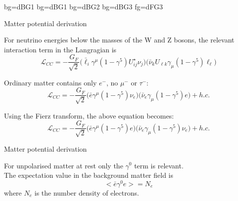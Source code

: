 {

          {bg=dBG1}
 {bg=dBG1}
  {bg=dBG2}
   {bg=dBG3}
   {fg=dFG3}

\begin{frame}{Matter potential derivation}

For neutrino energies below the masses of the W and Z bosons,
the relevant interaction term in the Langragian is
\begin{equation*}
\mathcal{L}_{CC} = -\frac{G_{F}}{\sqrt{2}}
  \Big( \bar{\ell}_{i} {\gamma}^{\mu} (1-{\gamma}^{5}) U^{\star}_{ij} {\nu}_{j} \Big)
  \Big( \bar{\nu}_{k} U_{\ell k} {\gamma}_{\mu} (1-{\gamma}^{5}) {\ell}_{\ell} \Big)
\end{equation*}

Ordinary matter contains only $e^{-}$, no $\mu^{-}$ or $\tau^{-}$:
\begin{equation*}
\mathcal{L}_{CC} = -\frac{G_{F}}{\sqrt{2}}
  \Big( \bar{e} {\gamma}^{\mu} (1-{\gamma}^{5}) {\nu}_{e} \Big)
  \Big( \bar{\nu}_{e} {\gamma}_{\mu} (1-{\gamma}^{5}) {e} \Big) + h.c.
\end{equation*}

Using the Fierz transform, the above equation becomes:
\begin{equation*}
\mathcal{L}_{CC} = -\frac{G_{F}}{\sqrt{2}}
  \Big( \bar{e} {\gamma}^{\mu} (1-{\gamma}^{5}) e \Big)
  \Big( \bar{\nu}_{e} {\gamma}_{\mu} (1-{\gamma}^{5}) \nu_{e} \Big) + h.c.
\end{equation*}

\end{frame}

%

\begin{frame}{Matter potential derivation}

For unpolarised matter at rest only the $\gamma^0$ term is relevant.\\
The expectation value in the background matter field is
\begin{equation*}
  <\bar{e} \gamma^0 e> = N_e
\end{equation*}
where $N_e$ is the number density of electrons.



\end{frame}}
